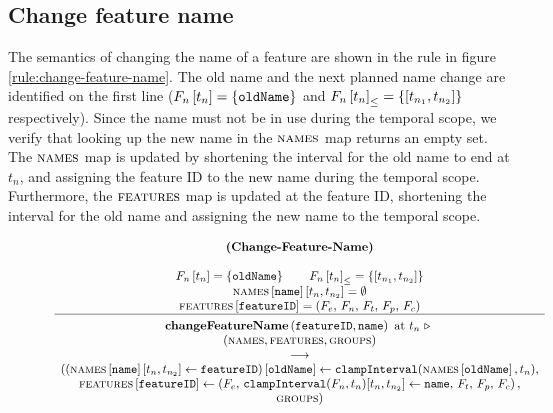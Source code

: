 \subsection{Change feature name}
\label{sub:change-feature-name}

The semantics of changing the name of a feature are shown in the  rule in figure \vref{rule:change-feature-name}. The old name and the next planned name change are identified on the first line ($F_n \left[ t_n \right] = \left\{\texttt{oldName}\right\}$ and $\containing{F_n}{t_n} = \set{\interval{t_{n_1}}{t_{n_2}}}$ respectively). Since the name must not be in use during the temporal scope, we verify that looking up the new name in the $\textsc{names}{}$ map returns an empty set. The $\textsc{names}{}$ map is updated by shortening the interval for the old name to end at $t_n$, and assigning the feature ID to the new name during the temporal scope. Furthermore, the $\textsc{features}{}$ map is updated at the feature ID, shortening the interval for the old name and assigning the new name to the temporal scope. 

\begin{figure}
    \renewcommand{\arraystretch}{1.1}
    \sossize$$\begin{array}{c}
      \ntyperule{Change-Feature-Name}
      {\\
        \lookup{F_n}{t_n} = \set{\var{oldName}} \qquad
        \containing{F_n}{t_n} = \set{\interval{t_{n_1}}{t_{n_2}}} \\
        \lookup{\names{}}{\var{name}}\interval{t_n}{t_{n_2}} = \emptyset \\
        \lookup{\features{}}{\var{featureID}} = \left( F_e,\, F_n,\, F_t,\, F_p,\, F_c \right)
      }
      {
        \textbf{changeFeatureName}\left( \var{featureID}, \var{name}\right) \text{ at } t_n \shove \\
        (\names{}, \features{}, \groups{}) \\
        \transition \\
        (\lookup{\left(\lookup{\names{}}{\var{name}}\interval{t_n}{t_{n_2}} \assign \var{featureID}\right)}{\var{oldName}} \assign \var{clampInterval}(\lookup{\names}{\var{oldName}}, t_n), \\
        \lookup{\features{}}{\var{featureID}} \assign \left( F_e,\, \var{clampInterval}(F_n, t_n)\interval{t_n}{t_{n_2}} \assign \var{name},\, F_t,\, F_p,\, F_c \right), \\
        \groups{})
      }
    \end{array}$$
  \caption{\label{rule:change-feature-name}}
\end{figure}
